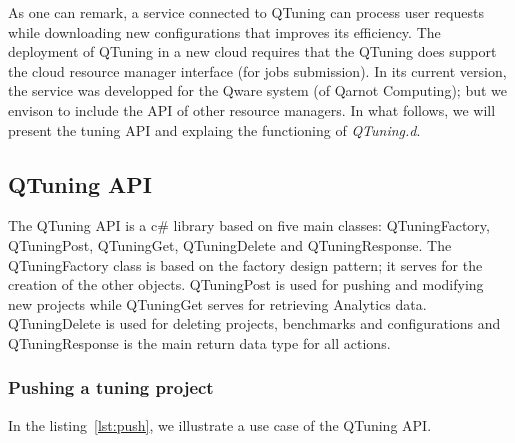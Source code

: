 \documentclass[10pt, conference, compsocconf]{IEEEtran}
\begin{document}
As one can remark, a service connected to QTuning can process user requests while downloading new 
configurations that improves its efficiency. The deployment of QTuning in a new cloud requires that the 
QTuning does  support the cloud resource manager interface (for jobs submission). 
In its current version, the service was developped for the Qware system (of Qarnot Computing);  
but we envison to include the API of other resource managers. In what follows, we will 
present the tuning API and explaing the functioning of {\it QTuning.d}.



\subsection{QTuning API} 

The QTuning API is a c\# library based on five main classes: QTuningFactory, QTuningPost, QTuningGet, QTuningDelete and QTuningResponse. 
The QTuningFactory class is based on the factory design pattern; it serves for the creation of the other objects. 
QTuningPost is used for pushing and modifying new projects while QTuningGet serves for retrieving Analytics data. QTuningDelete is used 
for deleting projects, benchmarks and configurations and QTuningResponse is the main return data type for all actions.

\subsubsection{Pushing a tuning project}
In the listing~\ref{lst:push}, we illustrate a use case of the QTuning API.
\end{document}
